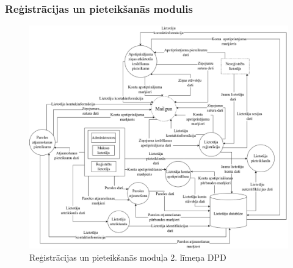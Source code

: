 \clearpage
\subsubsection{Reģistrācijas un pieteikšanās modulis}

\begin{figure}[htbp]
	\centering
	\includegraphics[width=\linewidth]{./src/img/ReģistrācijasPieteikšanāsModulis.png}
	\caption{Reģistrācijas un pieteikšanās moduļa 2. līmeņa DPD}
	\label{fig:dpd-2-auth}
\end{figure}








